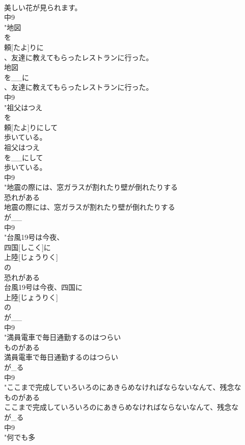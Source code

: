 \documentclass[8pt]{extreport}
\begin{document}
\begin{CJK}{UTF8}{min}
\\	美しい花が見られます。
\\	中9
\\	"地図
\\	を
\\	頼[たよ]りに
\\	、友達に教えてもらったレストランに行った。
\\	地図
\\	を__に
\\	、友達に教えてもらったレストランに行った。
\\	中9
\\	"祖父はつえ
\\	を
\\	頼[たよ]りにして
\\	歩いている。
\\	祖父はつえ
\\	を__にして
\\	歩いている。
\\	中9
\\	"地震の際には、窓ガラスが割れたり壁が倒れたりする
\\	恐れがある
\\	地震の際には、窓ガラスが割れたり壁が倒れたりする
\\	が__
\\	中9
\\	"台風19号は今夜、
\\	四国[しこく]に
\\	上陸[じょうりく]
\\	の
\\	恐れがある
\\	台風19号は今夜、四国に
\\	上陸[じょうりく]
\\	の
\\	が__
\\	中9
\\	"満員電車で毎日通勤するのはつらい
\\	ものがある
\\	満員電車で毎日通勤するのはつらい
\\	が_る
\\	中9
\\	"ここまで完成していろいろのにあきらめなければならないなんて、残念な
\\	ものがある
\\	ここまで完成していろいろのにあきらめなければならないなんて、残念な
\\	が_る
\\	中9
\\	"何でも多

\end{CJK}
\end{document}
